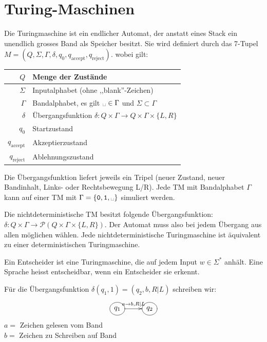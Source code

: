 \documentclass[a4paper]{article}
\def\blank{\text{\textvisiblespace}}
\begin{document}
\section{Turing-Maschinen}
	\begin{multicols}{2}
	
	\begin{fdef}
		Die Turingmaschine ist ein endlicher Automat, der anstatt eines Stack ein unendlich grosses Band als Speicher besitzt. Sie wird definiert durch das 7-Tupel
		$M=(Q,\Sigma,\Gamma,\delta,q_0,q_{\text{accept}},q_{\text{reject}})$.
		wobei gilt:
		
		\vspace{2mm}
		\begin{tabular}{r|l}
		$Q$      & Menge der Zustände \\\hline
		$\Sigma$ & Inputalphabet (ohne ,,blank''-Zeichen) \\\hline
		$\Gamma$ & Bandalphabet, es gilt $\blank \in \Gamma$ und $\Sigma \subset \Gamma$ \\\hline
		$\delta$ & Übergangsfunktion $\delta: Q \times \Gamma \rightarrow Q \times \Gamma \times \{ L,R \}$ \\\hline
		$q_0$               & Startzustand \\\hline
		$q_{\text{accept}}$ & Akzeptierzustand \\\hline
		$q_{\text{reject}}$ & Ablehnungszustand
		\end{tabular}
		\vspace{2mm}
		
		Die Übergangsfunktion liefert jeweils ein Tripel (neuer Zustand, neuer Bandinhalt, Links- oder Rechtsbewegung L/R). Jede TM mit Bandalphabet $\Gamma$ kann auf einer TM mit $\Gamma = \{\texttt{0},\texttt{1},\blank\}$ simuliert werden.
	\end{fdef}
	
	\begin{fdef}
		Die nichtdeterministische TM besitzt folgende Übergangsfunktion: $\delta: Q \times \Gamma \rightarrow \mathcal{P}(Q \times \Gamma \times \{ L,R \})$. Der Automat muss also bei jedem Übergang aus allen möglichen wählen.
		Jede nichtdeterministische Turingmaschine ist äquivalent zu einer deterministischen
		Turingmaschine.
	\end{fdef}
	
	\begin{fdef}[Entscheider]
	Ein Entscheider ist eine Turingmaschine, die auf jedem Input $w \in \Sigma^*$ anhält. Eine Sprache heisst entscheidbar, wenn ein Entscheider sie erkennt.
	\end{fdef}
	
	\begin{fmerke}[Zustandsautomat]
	Für die Übergangsfunktion $\delta(q_1,1) = (q_2,b,R|L)$ schreiben wir:
		\[ \entrymodifiers={++[o][F]}
			         \xymatrix{   q_1 \ar[r]^{a \rightarrow b,R|L} & q_2   } \]
	$a = $ Zeichen gelesen vom Band \\
	$b = $ Zeichen zu Schreiben auf Band
	\end{fmerke}
	
	\end{multicols}	
	
\end{document}
